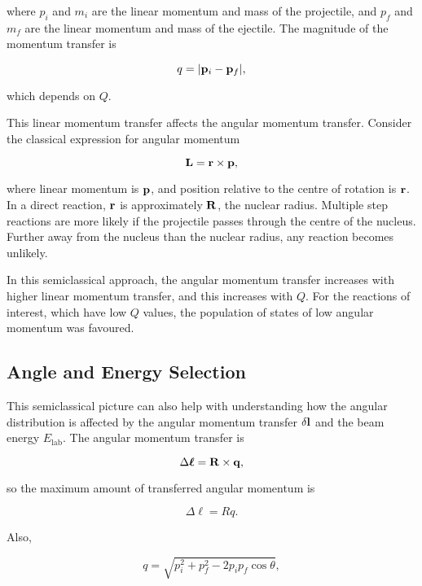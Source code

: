 where $p_i$ and $m_i$ are the linear momentum and mass of the projectile, and $p_f$ and $m_f$ are the linear momentum and mass of the ejectile. The magnitude of the momentum transfer is 

\begin{equation}
q = |{\bf p}_i - {\bf p}_f|\mathrm{,}
\end{equation}

which depends on $Q$.

This linear momentum transfer affects the angular momentum transfer. Consider the classical expression for angular momentum

\begin{equation}
{\bf L} = {\bf r} \times {\bf p}\mathrm{,}
\end{equation}

where linear momentum is ${\bf p}$, and position relative to the centre of rotation is ${\bf r}$. In a direct reaction, ${\bf r}$ is approximately ${\bf R}$, the nuclear radius. Multiple step reactions are more likely if the projectile passes through the centre of the nucleus. Further away from the nucleus than the nuclear radius, any reaction becomes unlikely.

In this semiclassical approach, the angular momentum transfer increases with higher linear momentum transfer, and this increases with $Q$. For the reactions of interest, which have low $Q$ values, the population of states of low angular momentum was favoured.

\subsection{Angle and Energy Selection}


This semiclassical picture can also help with understanding how the angular distribution is affected by the angular momentum transfer $\delta {\bf l}$ and the beam energy $E_{\mathrm{lab}}$. The angular momentum transfer is

\begin{equation}
\Delta {\boldsymbol \ell} = {\bf R} \times {\bf q}\mathrm{,}
\end{equation}

so the maximum amount of transferred angular momentum is

\begin{equation}
\Delta \ell = R q \mathrm{.}
\end{equation}

Also,

\begin{equation} \label{momentumTransfer}
q = \sqrt{p_i^2 + p_f^2 - 2 p_i p_f \cos \theta}\mathrm{,}
\end{equation}

